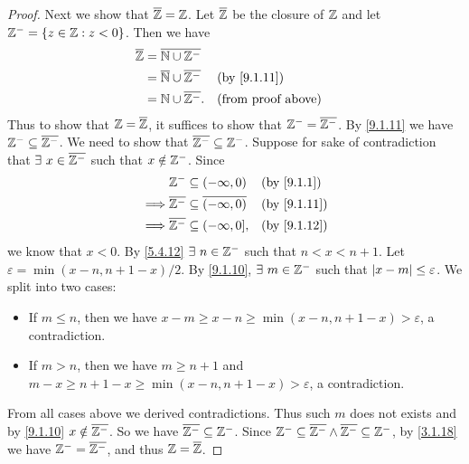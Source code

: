 \begin{proof}
  Next we show that \(\overline{\mathbb{Z}} = \mathbb{Z}\).
  Let \(\overline{\mathbb{Z}}\) be the closure of \(\mathbb{Z}\) and let \(\mathbb{Z}^- = \{z \in \mathbb{Z} : z < 0\}\).
  Then we have
  \begin{align*}
    \overline{\Z} & = \overline{\N \cup \Z^-}                                           \\
                  & = \overline{\N} \cup \overline{\Z^-} &  & \text{(by \cref{9.1.11})} \\
                  & = \N \cup \overline{\Z^-}.           &  & \text{(from proof above)}
  \end{align*}
  Thus to show that \(\mathbb{Z} = \overline{\mathbb{Z}}\), it suffices to show that \(\mathbb{Z}^- = \overline{\mathbb{Z}^-}\).
  By \cref{9.1.11} we have \(\mathbb{Z}^- \subseteq \overline{\mathbb{Z}^-}\).
  We need to show that \(\overline{\mathbb{Z}^-} \subseteq \mathbb{Z}^-\).
  Suppose for sake of contradiction that \(\exists\ x \in \overline{\mathbb{Z}^-}\) such that \(x \notin \mathbb{Z}^-\).
  Since
  \begin{align*}
             & \Z^- \subseteq (-\infty, 0)                       &  & \text{(by \cref{9.1.1})}  \\
    \implies & \overline{\Z^-} \subseteq \overline{(-\infty, 0)} &  & \text{(by \cref{9.1.11})} \\
    \implies & \overline{\Z^-} \subseteq (-\infty, 0],           &  & \text{(by \cref{9.1.12})}
  \end{align*}
  we know that \(x < 0\).
  By \cref{5.4.12} \(\exists\ n \in \Z^-\) such that \(n < x < n + 1\).
  Let \(\varepsilon = \min(x - n, n + 1 - x) / 2\).
  By \cref{9.1.10}, \(\exists\ m \in \mathbb{Z}^-\) such that \(\left\lvert x - m\right\rvert \leq \varepsilon\).
  We split into two cases:
  \begin{itemize}
    \item If \(m \leq n\), then we have \(x - m \geq x - n \geq \min(x - n, n + 1 - x) > \varepsilon\), a contradiction.
    \item If \(m > n\), then we have \(m \geq n + 1\) and \(m - x \geq n + 1 - x \geq \min(x - n, n + 1 - x) > \varepsilon\), a contradiction.
  \end{itemize}
  From all cases above we derived contradictions.
  Thus such \(m\) does not exists and by \cref{9.1.10} \(x \notin \overline{\mathbb{Z}^-}\).
  So we have \(\overline{\mathbb{Z}^-} \subseteq \mathbb{Z}^-\).
  Since \(\mathbb{Z}^- \subseteq \overline{\mathbb{Z}^-} \land \overline{\mathbb{Z}^-} \subseteq \mathbb{Z}^-\), by \cref{3.1.18} we have \(\mathbb{Z}^- = \overline{\mathbb{Z}^-}\), and thus \(\mathbb{Z} = \overline{\mathbb{Z}}\).


\end{proof}
